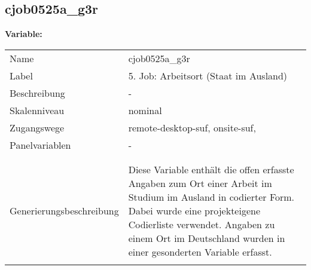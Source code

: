 	
	
	\subsection{cjob0525a\_g3r}
	\label{subSection:cjob0525a_g3r}

	\noindent\textbf{Variable:}\\
		\begin{tabular}{lL{11.3cm}}
			\label{tableVariable:cjob0525a_g3r}
			Name & cjob0525a\_g3r \\
			Label & 5. Job: Arbeitsort (Staat im Ausland) \\
			Beschreibung & - \\
			Skalenniveau & nominal \\
			Zugangswege &
				remote-desktop-suf,
				onsite-suf,
 \\
			Panelvariablen & -
			 \\
			 \\
 \\
					Generierungsbeschreibung & Diese Variable enthält die offen erfasste Angaben zum Ort einer Arbeit im Studium im Ausland in codierter Form. Dabei wurde eine projekteigene Codierliste verwendet. Angaben zu einem Ort im Deutschland wurden in einer gesonderten Variable erfasst. 
				 \\	
			 \\
		\end{tabular}






